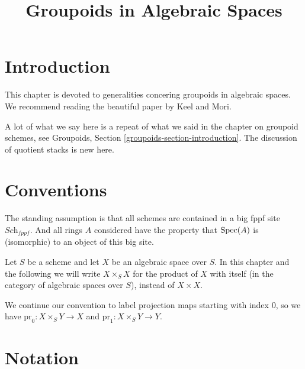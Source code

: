 

%


\title{Groupoids in Algebraic Spaces}


\maketitle

\label{section-phantom}

\tableofcontents

\section{Introduction}
\label{section-introduction}

\noindent
This chapter is devoted to generalities concering groupoids in algebraic
spaces. We recommend reading the beautiful paper \cite{K-M} by Keel and Mori.

\medskip\noindent
A lot of what we say here is a repeat of what we said in the chapter
on groupoid schemes, see
Groupoids, Section \ref{groupoids-section-introduction}.
The discussion of quotient stacks is new here.


\section{Conventions}
\label{section-conventions}

\noindent
The standing assumption is that all schemes are contained in
a big fppf site $\textit{Sch}_{fppf}$. And all rings $A$ considered
have the property that $\mathop{\rm Spec}(A)$ is (isomorphic) to an
object of this big site.

\medskip\noindent
Let $S$ be a scheme and let $X$ be an algebraic space over $S$.
In this chapter and the following we will write $X \times_S X$
for the product of $X$ with itself (in the category of algebraic
spaces over $S$), instead of $X \times X$.

\medskip\noindent
We continue our convention to label projection maps starting with
index $0$, so we have $\text{pr}_0 : X \times_S Y \to X$ and
$\text{pr}_1 : X \times_S Y \to Y$.




\section{Notation}
\label{section-notation}

